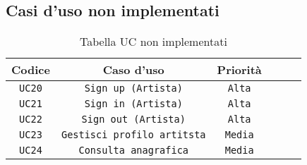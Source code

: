 \newpage
\subsection{Casi d'uso non implementati} 
\begin{table} [h!]
    \begin{center}
        \begin{tabular}{ |Sc|Sc|Sc| } 
         \hline
         Codice & Caso d'uso & Priorità \\ 
         \hline
         \hline
         \texttt{UC20} & \texttt{Sign up (Artista)} & \texttt{Alta} \\ 
         \hline
         \texttt{UC21} & \texttt{Sign in (Artista)} & \texttt{Alta} \\ 
         \hline
         \texttt{UC22} & \texttt{Sign out (Artista)} & \texttt{Alta} \\ 
         \hline
         \texttt{UC23} & \texttt{Gestisci profilo artitsta} & \texttt{Media} \\ 
         \hline
         \texttt{UC24} & \texttt{Consulta anagrafica} & \texttt{Media} \\ 
         \hline
         \end{tabular}
    \end{center}
    \caption{Tabella UC non implementati}
\end{table}
